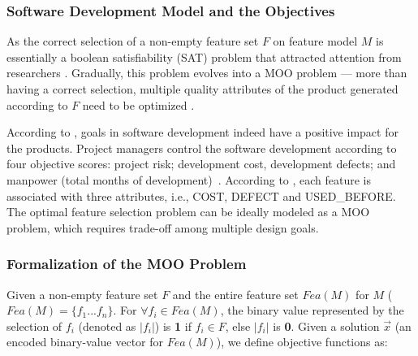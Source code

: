\subsubsection{Software Development Model and the Objectives}
As the correct selection of a non-empty feature set $F$ on feature model $M$ is essentially a boolean satisfiability (SAT) problem that attracted attention from researchers \cite{DBLP:conf/pfe/MannionC03}\cite{DBLP:conf/caise/BenavidesTC05}. %
Gradually, this problem evolves into a MOO problem --- more than having a correct selection, multiple quality attributes of the product  generated according to $F$ need to be  optimized .

According to \cite{DBLP:journals/misq/Abdel-HamidSS99}, goals in software development indeed have a positive impact for the products. Project managers control the software development according to four objective scores: project risk; development cost, development defects; and manpower (total months of development)~\cite{DBLP:journals/misq/Abdel-HamidSS99}. %
According to \cite{DBLP:conf/icse/SayyadMA13}, each feature %
is associated with three attributes, i.e., COST, DEFECT and USED\_BEFORE. The optimal feature selection problem can be ideally modeled as a MOO problem, which requires trade-off among multiple design goals.

\subsubsection{Formalization of the MOO Problem}\label{sec:problem:moo}

  Given a non-empty feature set $F$ and the entire feature set $Fea(M)$ for $M$ ($Fea(M) =\{f_1 ... f_n\}$. For  $ \forall f_i \in Fea(M)$, the binary value represented by the selection of $f_i$ (denoted as $|f_i|$) is \textbf{1} if $f_i \in F$, else $|f_i|$ is  \textbf{0}. Given a solution $\vec x$ (an encoded binary-value vector for $Fea(M)$),  we define objective functions as:

